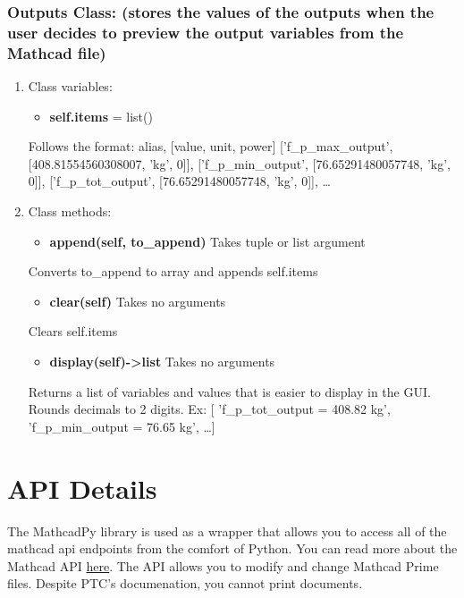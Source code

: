 \documentclass[11pt]{article}
\begin{document}
\subsubsection{Outputs Class: (stores the values of the outputs when the user decides to preview the output variables from the Mathcad file)}
\label{sec:org3ccf58b}
\begin{enumerate}
\item Class variables:
\label{sec:orge60f7e7}

\begin{itemize}
\item \textbf{self.items} = list()
\end{itemize}
Follows the format:
alias, [value, unit, power]
['f\_p\_max\_output', [408.81554560308007, 'kg', 0]],
['f\_p\_min\_output', [76.65291480057748, 'kg', 0]],
['f\_p\_tot\_output', [76.65291480057748, 'kg', 0]],
\ldots{}
\item Class methods:
\label{sec:org243dda9}
\begin{itemize}
\item \textbf{append(self, to\_append)} Takes tuple or list argument
\end{itemize}
Converts to\_append to array and appends self.items

\begin{itemize}
\item \textbf{clear(self)} Takes no arguments
\end{itemize}
Clears self.items

\begin{itemize}
\item \textbf{display(self)->list} Takes no arguments
\end{itemize}
Returns a list of variables and values that is easier to display in the GUI. Rounds decimals to 2 digits.
Ex: [ 'f\_p\_tot\_output = 408.82 kg', 'f\_p\_min\_output = 76.65 kg', \ldots{}]
\end{enumerate}

\section{API Details}
\label{sec:org8a4c024}

The MathcadPy library is used as a wrapper that allows you to access all of the mathcad api endpoints from the comfort of Python. You can read more about the Mathcad API \href{https://support.ptc.com/help/mathcad/r7.0/en/index.html\#page/PTC\_Mathcad\_Help\%2Fmathcad\_and\_automation\_api.html\%23}{here}. The API allows you to modify and change Mathcad Prime files. Despite PTC's documenation, you cannot print documents.
\end{document}

